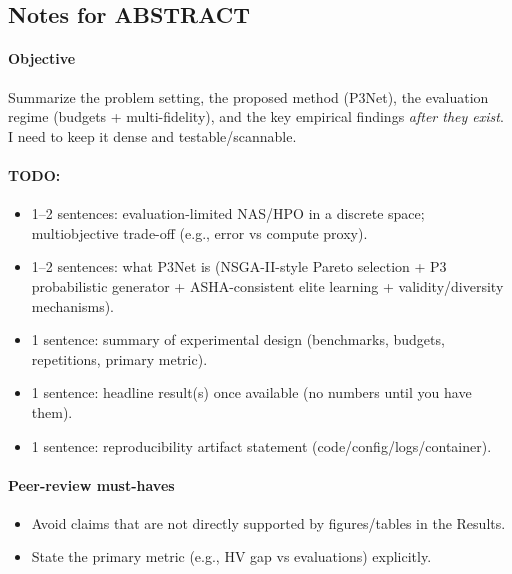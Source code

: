 \subsection*{Notes for ABSTRACT}
\paragraph{Objective}
Summarize the problem setting, the proposed method (P3Net), the evaluation regime (budgets + multi-fidelity), and the key empirical findings \emph{after they exist}. I need to keep it dense and testable/scannable.

\paragraph{TODO:}
\begin{itemize}
  \item 1--2 sentences: evaluation-limited NAS/HPO in a discrete space; multiobjective trade-off (e.g., error vs compute proxy).
  \item 1--2 sentences: what P3Net is (NSGA-II-style Pareto selection + P3 probabilistic generator + ASHA-consistent elite learning + validity/diversity mechanisms).
  \item 1 sentence: summary of experimental design (benchmarks, budgets, repetitions, primary metric).
  \item 1 sentence: headline result(s) once available (no numbers until you have them).
  \item 1 sentence: reproducibility artifact statement (code/config/logs/container).
\end{itemize}

\paragraph{Peer-review must-haves}
\begin{itemize}
  \item Avoid claims that are not directly supported by figures/tables in the Results.
  \item State the primary metric (e.g., HV gap vs evaluations) explicitly.
\end{itemize}
